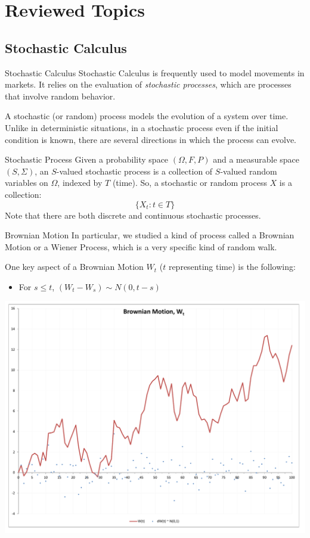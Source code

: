 \documentclass{beamer}
\begin{document}
\section{Reviewed Topics}
\subsection{Stochastic Calculus}
\begin{frame}{Stochastic Calculus}{}
 Stochastic Calculus is frequently used to model movements in markets. It relies on the evaluation of \textit{stochastic processes}, which are processes that involve random behavior.\bigskip
\pause

A stochastic (or random) process models the evolution of a system over time. Unlike in deterministic situations, in a stochastic process even if the initial condition is known, there are several directions in which the process can evolve.

\end{frame}

\begin{frame}{Stochastic Process}
Given a probability space $(\Omega, F, P)$ and a measurable space $(S, \Sigma)$, an $S$-valued stochastic process is a collection of $S$-valued random variables on $\Omega$, indexed by $T$ (time). So, a stochastic or random process $X$ is a collection:
$$
\{X_t : t\in T\}
$$
\pause
Note that there are both discrete and continuous stochastic processes.
\end{frame}

\begin{frame}{Brownian Motion}
In particular, we studied a kind of process called a Brownian Motion or a Wiener Process, which is a very specific kind of random walk.\bigskip

One key aspect of a Brownian Motion $W_t$ ($t$ representing time) is the following:
\pause
\begin{itemize} \item[] For $s\leq t$, $(W_{t}-W_{s}) \sim N(0, t-s)$ \end{itemize}
\end{frame}

\begin{frame}
\includegraphics[scale=.35]{brownianchart.pdf}
\end{frame}
\end{document}
